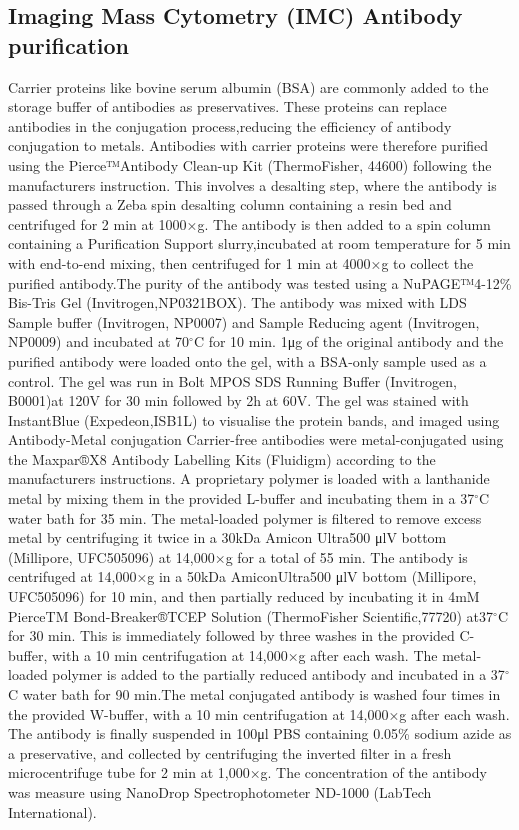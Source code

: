 \subsection{Imaging Mass Cytometry (IMC) Antibody purification}
Carrier proteins like bovine serum albumin (BSA) are commonly added to the storage buffer of antibodies as preservatives. These proteins can replace antibodies in the conjugation process,reducing the efficiency of antibody conjugation to metals. Antibodies with carrier proteins were therefore purified using the Pierce™Antibody Clean-up Kit (ThermoFisher, 44600) following the manufacturers instruction.  This involves a desalting step, where the antibody is passed through a Zeba spin desalting column containing a resin bed and centrifuged for 2 min at 1000×g. The antibody is then added to a spin column containing a Purification Support slurry,incubated at room temperature for 5 min with end-to-end mixing, then centrifuged for 1 min at 4000×g to collect the purified antibody.The purity of the antibody was tested using a NuPAGE™4-12\% Bis-Tris Gel (Invitrogen,NP0321BOX). The antibody was mixed with LDS Sample buffer (Invitrogen, NP0007) and Sample Reducing agent (Invitrogen, NP0009) and incubated at 70${^\circ}$C for 10 min. 1μg of the original antibody and the purified antibody were loaded onto the gel, with a BSA-only sample used as a control. The gel was run in Bolt MPOS SDS Running Buffer (Invitrogen, B0001)at 120V for 30 min followed by 2h at 60V. The gel was stained with InstantBlue (Expedeon,ISB1L) to visualise the protein bands, and imaged using Antibody-Metal conjugation Carrier-free antibodies were metal-conjugated using the Maxpar®X8 Antibody Labelling Kits (Fluidigm) according to the manufacturers instructions. A proprietary polymer is loaded with a lanthanide metal by mixing them in the provided L-buffer and incubating them in a 37${^\circ}$C water bath for 35 min. The metal-loaded polymer is filtered to remove excess metal by centrifuging it twice in a 30kDa Amicon Ultra500 μlV bottom (Millipore, UFC505096) at 14,000×g for a total of 55 min. The antibody is centrifuged at 14,000×g in a 50kDa AmiconUltra500 μlV bottom (Millipore,  UFC505096) for 10 min,  and then partially reduced by incubating it in 4mM PierceTM Bond-Breaker®TCEP Solution (ThermoFisher Scientific,77720) at37${^\circ}$C for 30 min.  This is immediately followed by three washes in the provided C-buffer, with a 10 min centrifugation at 14,000×g after each wash. The metal-loaded polymer is added to the partially reduced antibody and incubated in a 37${^\circ}$C water bath for 90 min.The metal conjugated antibody is washed four times in the provided W-buffer, with a 10 min centrifugation at 14,000×g after each wash. The antibody is finally suspended in 100μl PBS containing 0.05\% sodium azide as a preservative, and collected by centrifuging the inverted filter in a fresh microcentrifuge tube for 2 min at 1,000×g. The concentration of the antibody was measure using NanoDrop Spectrophotometer ND-1000 (LabTech International).

